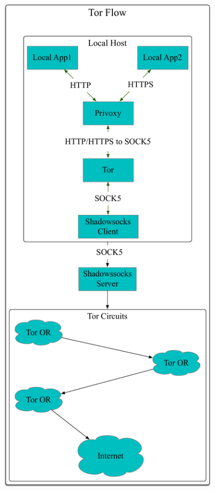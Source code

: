 \documentclass[12pt]{article}  %
\begin{document}
\begin{figure}[h]
\centering
\includegraphics[scale=0.3]{pic/tor2.pdf}
\end{figure}
\end{document}
